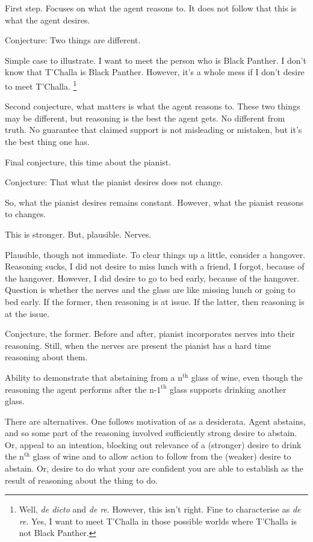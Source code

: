 \begin{note}[Examples]
  First step.
  Focuses on what the agent reasons to.
  It does not follow that this is what the agent desires.

  Conjecture:
  Two things are different.

  Simple case to illustrate.
  I want to meet the person who is Black Panther.
  I don't know that T'Challa is Black Panther.
  However, it's a whole mess if I don't desire to meet T'Challa.\nolinebreak
  \footnote{
    Well, \emph{de dicto} and \emph{de re}.
    However, this isn't right.
    Fine to characterise as \emph{de re}.
    Yes, I want to meet T'Challa in those possible worlds where T'Challa is not Black Panther.
  }

  Second conjecture, what matters is what the agent reasons to.
  These two things may be different, but reasoning is the best the agent gets.
  No different from truth.
  No guarantee that claimed support is not misleading or mistaken, but it's the best thing one has.

  

  Final conjecture, this time about the pianist.

  Conjecture:
  That what the pianist desires does not change.

  So, what the pianist desires remains constant.
  However, what the pianist reasons to changes.

  This is stronger.
  But, plausible.
  Nerves.

  Plausible, though not immediate.
  To clear things up a little, consider a hangover.
  Reasoning sucks, I did not desire to miss lunch with a friend, I forgot, because of the hangover.
  However, I did desire to go to bed early, because of the hangover.
  Question is whether the nerves and the glass are like missing lunch or going to bed early.
  If the former, then reasoning is at issue.
  If the latter, then reasoning is at the issue.

  Conjecture, the former.
  Before and after, pianist incorporates nerves into their reasoning.
  Still, when the nerves are present the pianist has a hard time reasoning about them.

  \hozline{}

  
  Ability to demonstrate that abstaining from a \(\text{n}^{\text{th}}\) glass of wine, even though the reasoning the agent performs after the \(\text{n-1}^{\text{th}}\) glass supports drinking another glass.

  There are alternatives.
  One follows motivation of \ESU{} as a desiderata.
  Agent abstains, and so some part of the reasoning involved sufficiently strong desire to abstain.
  Or, appeal to an intention, blocking out relevance of a (stronger) desire to drink the \(\text{n}^{\text{th}}\) glass of wine and to allow action to follow from the (weaker) desire to abstain.
  Or, desire to do what your are confident you are able to establish as the result of reasoning about the thing to do.


\end{note}
